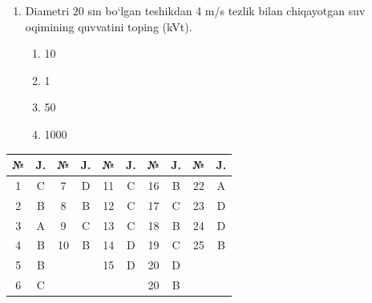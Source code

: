 \begin{enumerate}
\item Diametri 20 sm bo‘lgan teshikdan 4 m/s tezlik bilan chiqayotgan suv oqimining quvvatini toping (kVt).
\begin{enumerate}[label=\Alph*)]
\item 10
\item 1
\item 50
\item 1000
\end{enumerate}

\end{enumerate}

    

\begin{table}[h!]
\centering
\begin{tabular}{|c|c|c|c|c|c|c|c|c|c|}
\hline
№ & J. & № & J. & № & J. & № & J. & № & J. \\ \hline
1 & C & 7 & D & 11 & C & 16 & B & 22 & A \\ \hline
2 & B & 8 & B & 12 & C & 17 & C & 23 & D \\ \hline
3 & A & 9 & C & 13 & C & 18 & B & 24 & D \\ \hline
4 & B & 10 & B & 14 & D & 19 & C & 25 & B \\ \hline
5 & B & & & 15 & D & 20 & D & & \\ \hline
6 & C & & & & & 20 & B & & \\ \hline
\end{tabular}
\end{table}